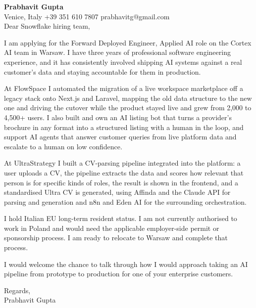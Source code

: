 \documentclass[a4paper,10.5pt]{article}
\begin{document}
\textbf{Prabhavit Gupta}\\
Venice, Italy \textbar{} +39 351 610 7807 \textbar{} prabhavitg@gmail.com\\[10pt]
Dear Snowflake hiring team,

I am applying for the Forward Deployed Engineer, Applied AI role on the Cortex AI team in Warsaw. I have three years of professional software engineering experience, and it has consistently involved shipping AI systems against a real customer's data and staying accountable for them in production.

At FlowSpace I automated the migration of a live workspace marketplace off a legacy stack onto Next.js and Laravel, mapping the old data structure to the new one and driving the cutover while the product stayed live and grew from 2,000 to 4,500+ users. I also built and own an AI listing bot that turns a provider's brochure in any format into a structured listing with a human in the loop, and support AI agents that answer customer queries from live platform data and escalate to a human on low confidence.

At UltraStrategy I built a CV-parsing pipeline integrated into the platform: a user uploads a CV, the pipeline extracts the data and scores how relevant that person is for specific kinds of roles, the result is shown in the frontend, and a standardised Ultra CV is generated, using Affinda and the Claude API for parsing and generation and n8n and Eden AI for the surrounding orchestration.

I hold Italian EU long-term resident status. I am not currently authorised to work in Poland and would need the applicable employer-side permit or sponsorship process. I am ready to relocate to Warsaw and complete that process.

I would welcome the chance to talk through how I would approach taking an AI pipeline from prototype to production for one of your enterprise customers.

Regards,\\
Prabhavit Gupta
\end{document}
